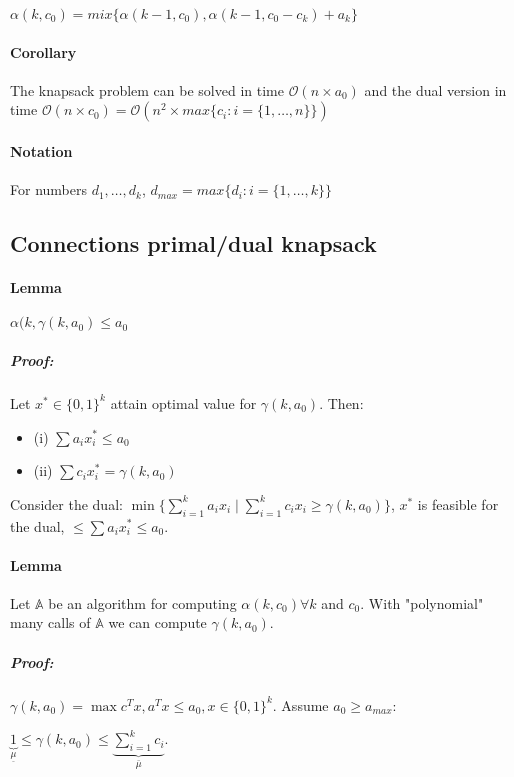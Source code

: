 \documentclass[main]{subfiles}
\begin{document}
$\alpha(k, c_{0}) = mix\{\alpha(k-1, c_{0}), \alpha(k-1, c_{0} - c_{k}) +
a_{k}\}$

\paragraph{Corollary} The knapsack problem can be solved in time
$\mathcal{O}(n \times a_{0})$ and the dual version in time
$\mathcal{O}(n \times c_{0}) = \mathcal{O}(n^{2} \times max\{c_{i}: i =
\{1, \dots, n\}\})$

\paragraph{Notation} For numbers $d_{1}, \dots, d_{k}$, $d_{max} = max\{d_{i}:
i =\{1, \dots, k\} \}$

\subsection{Connections primal/dual knapsack}

\paragraph{Lemma} $\alpha(k, \gamma(k, a_{0}) \leq a_{0}$

\subparagraph{Proof:}
Let $x^{*} \in \{0,1\}^{k}$ attain optimal value for $\gamma(k, a_{0})$.
Then:
\begin{itemize}
\item (i) $\sum a_{i}x_{i}^{*} \leq a_{0}$
\item (ii) $\sum c_{i}x_{i}^{*} = \gamma(k, a_{0})$
\end{itemize}

Consider the dual: $\min \{\sum_{i=1}^{k} a_i x_{i} \mid \sum_{i=1}^{k}
c_{i} x_{i} \geq \gamma(k, a_{0})\}$, $x^{*}$ is feasible for the dual,
$\leq \sum a_{i}x_{i}^{*} \leq a_{0}$.

\paragraph{Lemma} Let $\mathbb{A}$ be an algorithm for computing
$\alpha(k, c_{0}) \forall k$ and $c_{0}$. With "polynomial" many calls of
$\mathbb{A}$ we can compute $\gamma(k, a_{0})$.

\subparagraph{Proof:}
$\gamma(k, a_{0}) = \max c^{T}x, a^{T}x \leq a_{0}, x \in \{0,1\}^{k}$.
Assume $a_{0} \geq a_{max}$:

$\underbrace{1}_{\underline{\mu}} \leq \gamma(k, a_{0}) \leq
\underbrace{\sum_{i=1}^{k}c_{i}}_{\bar{\mu}}$.
\end{document}
